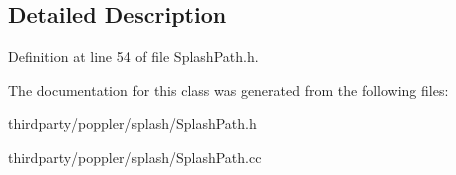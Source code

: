 \subsection{Detailed Description}


Definition at line 54 of file Splash\+Path.\+h.



The documentation for this class was generated from the following files\+:\begin{DoxyCompactItemize}
\item 
thirdparty/poppler/splash/Splash\+Path.\+h\item 
thirdparty/poppler/splash/Splash\+Path.\+cc\end{DoxyCompactItemize}
